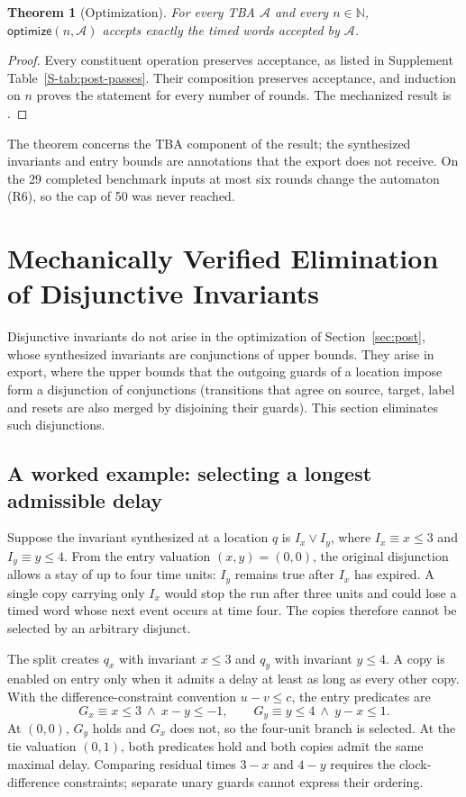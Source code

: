 \documentclass[preprint,12pt]{elsarticle}
\let\pathfragile\path
\DeclareRobustCommand\path{\pathfragile}
\providecommand{\Nat}{\mathbb{N}}
\providecommand{\optimize}{\mathsf{optimize}}
\newtheorem{theorem}{Theorem}[section]
\begin{document}
\begin{theorem}[Optimization]
\label{thm:optimization}
For every TBA $\mathcal A$ and every $n\in\Nat$, $\optimize(n,\mathcal A)$ accepts exactly the timed words accepted by $\mathcal A$.
\end{theorem}
\begin{proof}
Every constituent operation preserves acceptance, as listed in Supplement Table~\ref{S-tab:post-passes}. Their composition preserves acceptance, and induction on $n$ proves the statement for every number of rounds. The mechanized result is .
\end{proof}

The theorem concerns the TBA component of the result; the synthesized invariants and entry bounds are annotations that the export does not receive. On the 29 completed benchmark inputs at most six rounds change the automaton (R6), so the cap of 50 was never reached.



\section{Mechanically Verified Elimination of Disjunctive Invariants}
\label{sec:split}
Disjunctive invariants do not arise in the optimization of Section~\ref{sec:post}, whose synthesized invariants are conjunctions of upper bounds. They arise in export, where the upper bounds that the outgoing guards of a location impose form a disjunction of conjunctions (transitions that agree on source, target, label and resets are also merged by disjoining their guards). This section eliminates such disjunctions.

\subsection{A worked example: selecting a longest admissible delay}
\label{subsec:disjunctive-worked-example}
Suppose the invariant synthesized at a location $q$ is
$I_x\lor I_y$, where $I_x\equiv x\le3$ and $I_y\equiv y\le4$. From the
entry valuation $(x,y)=(0,0)$, the original disjunction allows a stay of up
to four time units: $I_y$ remains true after $I_x$ has expired. A single
copy carrying only $I_x$ would stop the run after three units and could lose
a timed word whose next event occurs at time four. The copies therefore
cannot be selected by an arbitrary disjunct.

The split creates $q_x$ with invariant $x\le3$ and $q_y$ with invariant
$y\le4$. A copy is enabled on entry only when it admits a delay at least as
long as every other copy. With the difference-constraint convention
$u-v\le c$, the entry predicates are
\[
  G_x \equiv x\le3\ \land\ x-y\le-1,
  \qquad
  G_y \equiv y\le4\ \land\ y-x\le1.
\]
At $(0,0)$, $G_y$ holds and $G_x$ does not, so the four-unit branch is
selected. At the tie valuation $(0,1)$, both predicates hold and both
copies admit the same maximal delay. Comparing residual times
$3-x$ and $4-y$ requires the clock-difference constraints; separate unary
guards cannot express their ordering.
\end{document}
